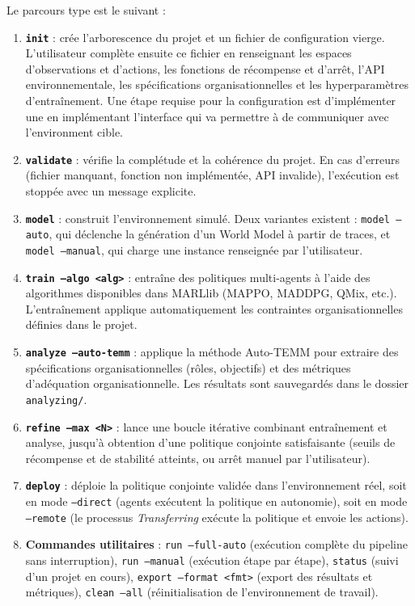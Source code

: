 \noindent Le parcours type est le suivant :
\begin{enumerate}
  \item \textbf{\texttt{init}} : crée l’arborescence du projet et un fichier de configuration vierge.
        L’utilisateur complète ensuite ce fichier en renseignant les espaces d’observations et d’actions, les fonctions de récompense et d’arrêt, l’API environnementale, les spécifications organisationnelles et les hyperparamètres d’entraînement. Une étape requise pour la configuration est d'implémenter une  en implémentant l'interface  qui va permettre à  de communiquer avec l'environment cible.
  \item \textbf{\texttt{validate}} : vérifie la complétude et la cohérence du projet.
        En cas d’erreurs (fichier manquant, fonction non implémentée, API invalide), l’exécution est stoppée avec un message explicite.
  \item \textbf{\texttt{model}} : construit l’environnement simulé.
        Deux variantes existent :
        \texttt{model --auto}, qui déclenche la génération d’un World Model à partir de traces, et
        \texttt{model --manual}, qui charge une instance  renseignée par l’utilisateur.
  \item \textbf{\texttt{train --algo <alg>}} : entraîne des politiques multi-agents à l’aide des algorithmes disponibles dans MARLlib (MAPPO, MADDPG, QMix, etc.).
        L’entraînement applique automatiquement les contraintes organisationnelles définies dans le projet.
  \item \textbf{\texttt{analyze --auto-temm}} : applique la méthode Auto-TEMM pour extraire des spécifications organisationnelles (rôles, objectifs) et des métriques d’adéquation organisationnelle.
        Les résultats sont sauvegardés dans le dossier \texttt{analyzing/}.
  \item \textbf{\texttt{refine --max <N>}} : lance une boucle itérative combinant entraînement et analyse, jusqu’à obtention d’une politique conjointe satisfaisante (seuils de récompense et de stabilité atteints, ou arrêt manuel par l’utilisateur).
  \item \textbf{\texttt{deploy}} : déploie la politique conjointe validée dans l’environnement réel, soit en mode \texttt{--direct} (agents exécutent la politique en autonomie), soit en mode \texttt{--remote} (le processus \textit{Transferring} exécute la politique et envoie les actions).
  \item \textbf{Commandes utilitaires} :
        \texttt{run --full-auto} (exécution complète du pipeline sans interruption),
        \texttt{run --manual} (exécution étape par étape),
        \texttt{status} (suivi d’un projet en cours),
        \texttt{export --format <fmt>} (export des résultats et métriques),
        \texttt{clean --all} (réinitialisation de l’environnement de travail).
\end{enumerate}

